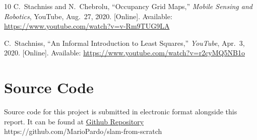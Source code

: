 \documentclass[12pt]{report}
\begin{document}
\begin{thebibliography}{10}
C.~Stachniss and N.~Chebrolu,
``Occupancy Grid Maps,''
\textit{Mobile Sensing and Robotics}, YouTube, Aug.\ 27, 2020.
[Online]. Available: \url{https://www.youtube.com/watch?v=v-Rm9TUG9LA}

C.~Stachniss,
``An Informal Introduction to Least Squares,''
\textit{YouTube}, Apr.\ 3, 2020.
[Online]. Available: \url{https://www.youtube.com/watch?v=r2cyMQ5NB1o}

\end{thebibliography}




\appendix

\chapter{Source Code}
\label{app:code}

Source code for this project is submitted in electronic format alongside this report.
\newline
It can be found at \href{https://github.com/MarioPardo/slam-from-scratch}{Github Repository}
\newline
https://github.com/MarioPardo/slam-from-scratch

\vspace{1cm}
\end{document}
